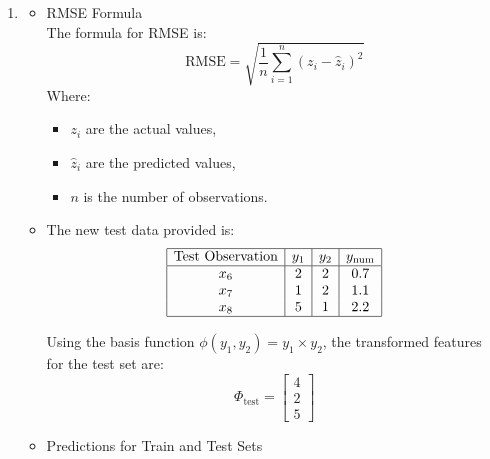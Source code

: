 \documentclass[12pt]{article}
\begin{document}
\begin{enumerate}[leftmargin=\labelsep, label=\textbf{\arabic*.)}]
    \item \begin{itemize}
              \item RMSE Formula \\
                    \vspace{0.5em}
                    The formula for RMSE is:
                    \[
                        \text{RMSE} = \sqrt{\frac{1}{n} \sum_{i=1}^{n} (z_i - \hat{z}_i)^2}
                    \]
                    Where:
                    \begin{itemize}
                        \item \( z_i \) are the actual values,
                        \item \( \hat{z}_i \) are the predicted values,
                        \item \( n \) is the number of observations.
                    \end{itemize}
                    \vspace{0.5em}
              \item The new test data provided is: \\
                    \[
                        \begin{array}{|c|c|c|c|}
                            \hline
                            \text{Test Observation} & y_1 & y_2 & y_{\text{num}} \\
                            \hline
                            x_6                     & 2   & 2   & 0.7            \\
                            x_7                     & 1   & 2   & 1.1            \\
                            x_8                     & 5   & 1   & 2.2            \\
                            \hline
                        \end{array}
                    \]

                    Using the basis function \( \phi(y_1, y_2) = y_1 \times y_2 \), the transformed features for the test set are:
                    \[
                        \Phi_{\text{test}} = \begin{bmatrix} 4 \\ 2 \\ 5 \end{bmatrix}
                    \]

              \item Predictions for Train and Test Sets \\


\end{itemize}
\end{enumerate}
\end{document}
